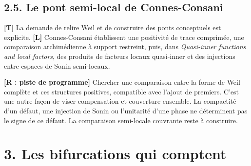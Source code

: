 \documentclass[
  10pt,
  a4paper,
]{article}
\begin{document}
\hypertarget{le-pont-semi-local-de-connes-consani}{%
\subsection{2.5. Le pont semi-local de
Connes-Consani}\label{le-pont-semi-local-de-connes-consani}}

\textbf{{[}T{]}} La demande de relire Weil et de construire des ponts
conceptuels est explicite. \textbf{{[}L{]}} Connes-Consani établissent
une positivité de trace comprimée, une comparaison archimédienne à
support restreint, puis, dans \emph{Quasi-inner functions and local
factors}, des produits de facteurs locaux quasi-inner et des injections
entre espaces de Sonin semi-locaux.

\textbf{{[}R : piste de programme{]}} Chercher une comparaison entre la
forme de Weil complète et ces structures positives, compatible avec
l'ajout de premiers. C'est une autre façon de viser compensation et
couverture ensemble. La compactité d'un défaut, une injection de Sonin
ou l'unitarité d'une phase ne déterminent pas le signe de ce défaut. La
comparaison semi-locale couvrante reste à construire.

\hypertarget{les-bifurcations-qui-comptent}{%
\section{3. Les bifurcations qui
comptent}\label{les-bifurcations-qui-comptent}}
\end{document}
